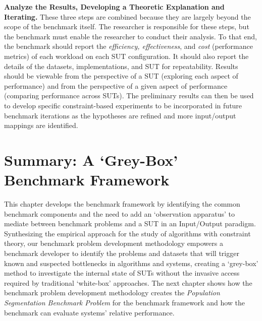 \textbf{Analyze the Results, Developing a Theoretic Explanation and Iterating.}
These three steps are combined because they are largely beyond the scope of the benchmark itself. 
The researcher is responsible for these steps, but the benchmark must enable the researcher to conduct their analysis. 
To that end, the benchmark should report the \textit{efficiency, effectiveness}, and \textit{cost} (performance metrics) of each workload on each \ac{SUT} configuration. 
It should also report the details of the datasets, implementations, and \ac{SUT} for repeatability. 
Results should be viewable from the perspective of a \ac{SUT} (exploring each aspect of performance) and from the perspective of a given aspect of performance (comparing performance across \ac{SUT}s). 
The preliminary results can then be used to develop specific constraint-based experiments to be incorporated in future benchmark iterations as the hypotheses are refined and more input/output mappings are identified. 



\section{Summary: A `Grey-Box' \gai Benchmark Framework}
This chapter develops the \gai benchmark framework by identifying the common benchmark components and the need to add an `observation apparatus' to mediate between benchmark problems and a \ac{SUT} in an Input/Output paradigm. 
Synthesizing the empirical approach for the study of algorithms with constraint theory, our \gai benchmark problem development methodology empowers a benchmark developer to identify the problems and datasets that will trigger known and suspected bottlenecks in \gai algorithms and systems, creating a `grey-box' method to investigate the internal state of \ac{SUT}s without the invasive access required by traditional `white-box' approaches. 
The next chapter shows how the \gai benchmark problem development methodology creates the \textit{Population Segmentation Benchmark Problem} for the \gai benchmark framework and how the benchmark can evaluate systems' relative performance. 



